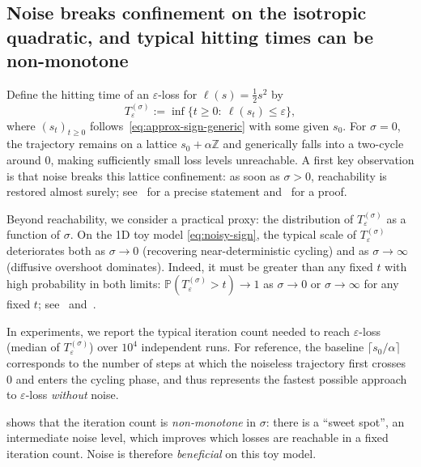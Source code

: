 \documentclass{article}
\theoremstyle{plain}
\theoremstyle{definition}
\theoremstyle{remark}
\newcommand{\Z}{\mathbb{Z}}
\newcommand{\PP}{\mathbb{P}}
\newcommand{\stepsize}{\alpha}
\newcommand{\sv}{{s}} %
\newcommand{\eps}{\varepsilon}
\begin{document}
\subsection{Noise breaks confinement on the isotropic quadratic, and typical hitting times can be non-monotone}

Define the hitting time of an $\eps$-loss for $\ell(\sv)=\tfrac12 \sv^2$ by
\[
T_\eps^{(\sigma)} := \inf\{t\ge 0:\ \ell(\sv_t)\le \eps\},
\]
where $(\sv_t)_{t\geq0}$ follows~\eqref{eq:approx-sign-generic} with some given $\sv_0$.
For $\sigma=0$, the trajectory remains on a lattice $\sv_0+\stepsize\Z$ and generically falls into a two-cycle around $0$, making sufficiently small loss levels unreachable. 
A first key observation is that noise breaks this lattice confinement: as soon as $\sigma>0$, 
reachability is restored almost surely; see~ for a precise statement and~ for a proof.




Beyond reachability, we consider a practical proxy: 
the distribution of $T_\eps^{(\sigma)}$ as a function of $\sigma$. 
On the 1D toy model \eqref{eq:noisy-sign}, 
the typical scale of $T_\eps^{(\sigma)}$ deteriorates both as $\sigma\to 0$ 
(recovering near-deterministic cycling) and as $\sigma\to\infty$ (diffusive overshoot dominates). 
Indeed, it must be greater than any fixed $t$ with high probability in both limits:
$\PP(T_\eps^{(\sigma)} > t)\to 1$ as $\sigma\to 0$ or $\sigma\to\infty$ for any fixed $t$;
see~ and~.

In experiments, we report 
the typical iteration count needed to reach $\eps$-loss (median of $T_\eps^{(\sigma)}$) 
over $10^4$ independent runs. 
For reference, the baseline $\lceil \sv_0/\stepsize \rceil$ corresponds to the number of steps  
at which the noiseless trajectory first crosses $0$ and enters the cycling phase, 
and thus represents the fastest possible approach to $\eps$-loss \emph{without} noise. 

 shows that the iteration count is \emph{non-monotone} in
$\sigma$: 
there is a ``sweet spot'', an intermediate noise level,  
which improves which losses are reachable in a fixed iteration count.  
Noise is therefore \emph{beneficial} on this toy model. 


\end{document}
